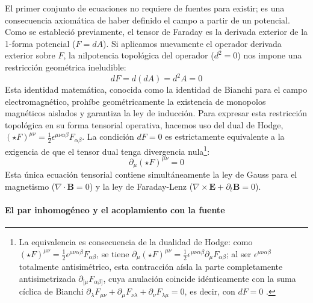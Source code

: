 \primerparrafo El primer conjunto de ecuaciones no requiere de fuentes para existir; es una consecuencia axiomática de haber definido el campo a partir de un potencial. Como se estableció previamente, el tensor de Faraday es la derivada exterior de la 1-forma potencial ($F = dA$). Si aplicamos nuevamente el operador derivada exterior sobre $F$, la nilpotencia topológica del operador ($d^2 = 0$) nos impone una restricción geométrica ineludible:
\begin{equation}
    dF = d(dA) = d^2A = 0
\end{equation}
Esta identidad matemática, conocida como la identidad de Bianchi para el campo electromagnético, prohíbe geométricamente la existencia de monopolos magnéticos aislados y garantiza la ley de inducción. Para expresar esta restricción topológica en su forma tensorial operativa, hacemos uso del dual de Hodge, $(\star F)^{\mu\nu} = \frac{1}{2} \epsilon^{\mu\nu\alpha\beta} F_{\alpha\beta}$. La condición $dF = 0$ es estrictamente equivalente a la exigencia de que el tensor dual tenga divergencia nula\footnote{La equivalencia es consecuencia de la dualidad de Hodge: como $(\star F)^{\mu\nu}=\tfrac12\epsilon^{\mu\nu\alpha\beta}F_{\alpha\beta}$, se tiene $\partial_\mu(\star F)^{\mu\nu}=\tfrac12\epsilon^{\mu\nu\alpha\beta}\partial_\mu F_{\alpha\beta}$; al ser $\epsilon^{\mu\nu\alpha\beta}$ totalmente antisimétrico, esta contracción aísla la parte completamente antisimetrizada $\partial_{[\mu}F_{\alpha\beta]}$, cuya anulación coincide idénticamente con la suma cíclica de Bianchi $\partial_\lambda F_{\mu\nu}+\partial_\mu F_{\nu\lambda}+\partial_\nu F_{\lambda\mu}=0$, es decir, con $dF=0$ \parencite{nakahara-2003, baez-muniain-1994}.}:
\begin{equation}
\label{eq:Maxwell_Homogeneas}
    \partial_\mu (\star F)^{\mu\nu} = 0
\end{equation}
Esta única ecuación tensorial contiene simultáneamente la ley de Gauss para el magnetismo ($\nabla \cdot \mathbf{B} = 0$) y la ley de Faraday-Lenz ($\nabla \times \mathbf{E} + \partial_t \mathbf{B} = 0$).

\paragraph{El par inhomogéneo y el acoplamiento con la fuente}

